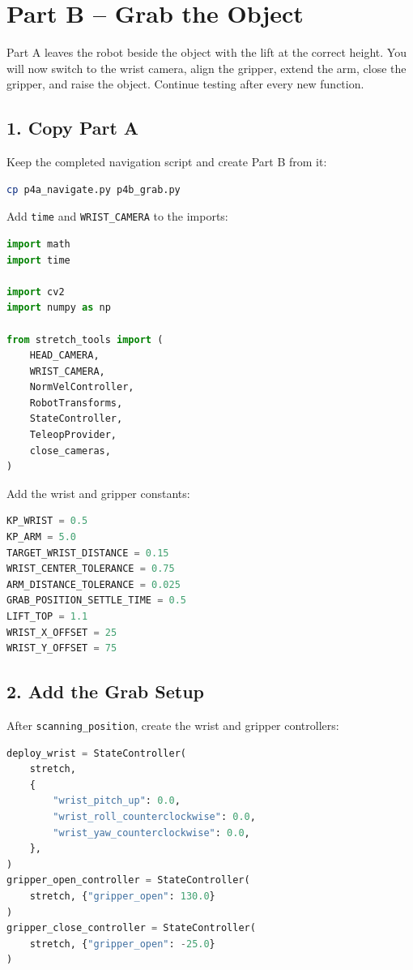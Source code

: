 \documentclass[11pt,a4paper]{article}
\begin{document}
\newpage

\section*{Part B -- Grab the Object}

Part A leaves the robot beside the object with the lift at the correct height.
You will now switch to the wrist camera, align the gripper, extend the arm,
close the gripper, and raise the object. Continue testing after every new
function.

\subsection*{1. Copy Part A}

Keep the completed navigation script and create Part B from it:

\begin{lstlisting}[language=bash]
cp p4a_navigate.py p4b_grab.py
\end{lstlisting}

Add \texttt{time} and \texttt{WRIST\_CAMERA} to the imports:

\begin{lstlisting}[language=Python]
import math
import time

import cv2
import numpy as np

from stretch_tools import (
    HEAD_CAMERA,
    WRIST_CAMERA,
    NormVelController,
    RobotTransforms,
    StateController,
    TeleopProvider,
    close_cameras,
)
\end{lstlisting}

Add the wrist and gripper constants:

\begin{lstlisting}[language=Python]
KP_WRIST = 0.5
KP_ARM = 5.0
TARGET_WRIST_DISTANCE = 0.15
WRIST_CENTER_TOLERANCE = 0.75
ARM_DISTANCE_TOLERANCE = 0.025
GRAB_POSITION_SETTLE_TIME = 0.5
LIFT_TOP = 1.1
WRIST_X_OFFSET = 25
WRIST_Y_OFFSET = 75
\end{lstlisting}

\subsection*{2. Add the Grab Setup}

After \texttt{scanning\_position}, create the wrist and gripper controllers:

\begin{lstlisting}[language=Python]
deploy_wrist = StateController(
    stretch,
    {
        "wrist_pitch_up": 0.0,
        "wrist_roll_counterclockwise": 0.0,
        "wrist_yaw_counterclockwise": 0.0,
    },
)
gripper_open_controller = StateController(
    stretch, {"gripper_open": 130.0}
)
gripper_close_controller = StateController(
    stretch, {"gripper_open": -25.0}
)
\end{lstlisting}
\end{document}
